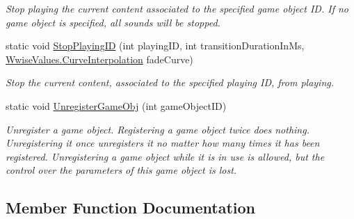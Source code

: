 \begin{DoxyCompactItemize}
\begin{DoxyCompactList}\small\item\em Stop playing the current content associated to the specified game object ID. If no game object is specified, all sounds will be stopped. \end{DoxyCompactList}\item 
static void \mbox{\hyperlink{classak_1_1soundengine_a210eb2a2ff2fb2c7c23187df448fef5a}{Stop\+Playing\+ID}} (int playing\+ID, int transition\+Duration\+In\+Ms, \mbox{\hyperlink{class_waapi_c_s_1_1_custom_values_1_1_wwise_values_a9014a599ab2b6e81b5e841de3603244d}{Wwise\+Values.\+Curve\+Interpolation}} fade\+Curve)
\begin{DoxyCompactList}\small\item\em Stop the current content, associated to the specified playing ID, from playing. \end{DoxyCompactList}\item 
static void \mbox{\hyperlink{classak_1_1soundengine_a937cfbdb071456806d43b6a04292d9d3}{Unregister\+Game\+Obj}} (int game\+Object\+ID)
\begin{DoxyCompactList}\small\item\em Unregister a game object. Registering a game object twice does nothing. Unregistering it once unregisters it no matter how many times it has been registered. Unregistering a game object while it is in use is allowed, but the control over the parameters of this game object is lost. \end{DoxyCompactList}\end{DoxyCompactItemize}


\subsection{Member Function Documentation}
\mbox{\label{classak_1_1soundengine_a9a535985a59833af4b6f449290f669e9}} 
